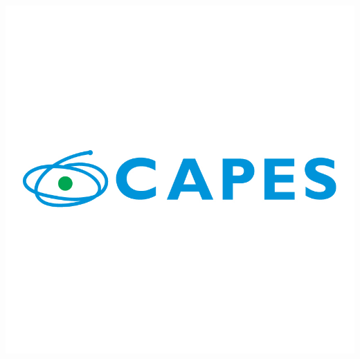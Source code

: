\documentclass[a0,portrait]{a0poster}
\begin{document}

%
\begin{minipage}[b]{0.7\linewidth}
\includegraphics[width=20cm]{logohorizontalcapes.jpg}\\
\end{minipage}
\end{document}
